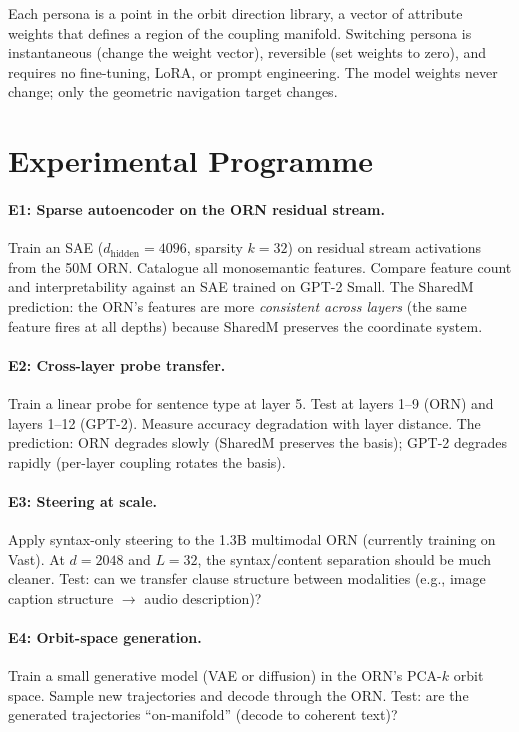 \documentclass[11pt, a4paper]{article}
\theoremstyle{plain}
\theoremstyle{definition}
\theoremstyle{remark}
\begin{document}
Each persona is a point in the orbit direction library, a vector of attribute weights that defines a region of the coupling manifold.
Switching persona is instantaneous (change the weight vector), reversible (set weights to zero), and requires no fine-tuning, LoRA, or prompt engineering.
The model weights never change; only the geometric navigation target changes.

\section{Experimental Programme}
\label{sec:experiments}

\paragraph{E1: Sparse autoencoder on the ORN residual stream.}
Train an SAE ($d_{\text{hidden}} = 4096$, sparsity $k{=}32$) on residual stream activations from the 50M ORN.
Catalogue all monosemantic features.
Compare feature count and interpretability against an SAE trained on GPT-2 Small.
The SharedM prediction: the ORN's features are more \emph{consistent across layers} (the same feature fires at all depths) because SharedM preserves the coordinate system.

\paragraph{E2: Cross-layer probe transfer.}
Train a linear probe for sentence type at layer 5.
Test at layers 1--9 (ORN) and layers 1--12 (GPT-2).
Measure accuracy degradation with layer distance.
The prediction: ORN degrades slowly (SharedM preserves the basis); GPT-2 degrades rapidly (per-layer coupling rotates the basis).

\paragraph{E3: Steering at scale.}
Apply syntax-only steering to the 1.3B multimodal ORN (currently training on Vast).
At $d{=}2048$ and $L{=}32$, the syntax/content separation should be much cleaner.
Test: can we transfer clause structure between modalities (e.g., image caption structure $\to$ audio description)?

\paragraph{E4: Orbit-space generation.}
Train a small generative model (VAE or diffusion) in the ORN's PCA-$k$ orbit space.
Sample new trajectories and decode through the ORN.
Test: are the generated trajectories ``on-manifold'' (decode to coherent text)?
\end{document}

